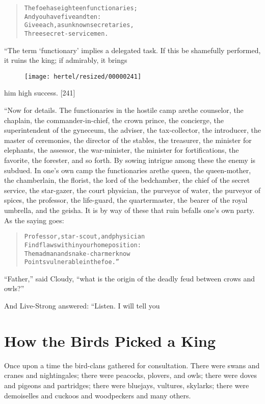 \documentclass[article, twoside, 10pt]{memoir}
\renewenvironment{verbatim}{%
\begin{quote}%
\vskip -10pt%
\begin{alltt}\normalfont\small}{\end{alltt}%
\end{quote}%
\vskip -10pt
} %
\begin{document}
\begin{verbatim}
The foe has eighteen functionaries;
    And you have five and ten:
Give each, as unknown secretaries,
    Three secret-service men.
\end{verbatim}
“The term `functionary' implies a delegated task. If this be
shamefully performed, it ruins the king; if admirably, it brings
\begin{figure}[p]\texttt{[image: hertel/resized/00000241]}\end{figure}him high success. [241]

“Now for details. The functionaries in the hostile camp are{\textemdash}the
counselor, the chaplain, the commander-in-chief, the crown prince,
the concierge, the superintendent of the gyneceum, the adviser, the
tax-collector, the introducer, the master of ceremonies, the
director of the stables, the treasurer, the minister for elephants,
the assessor, the war-minister, the minister for fortifications,
the favorite, the forester, and so forth. By sowing intrigue among
these the enemy is subdued. In one's own camp the functionaries
are{\textemdash}the queen, the queen-mother, the chamberlain, the florist,
the lord of the bedchamber, the chief of the secret service, the
star-gazer, the court physician, the purveyor of water, the
purveyor of spices, the professor, the life-guard, the
quartermaster, the bearer of the royal umbrella, and the geisha. It
is by way of these that ruin befalls one's own party. As the saying
goes:

\begin{verbatim}
Professor, star-scout, and physician
Find flaws within your home position:
The madman and snake-charmer know
Points vulnerable in the foe.”
\end{verbatim}
``Father,'' said Cloudy,
``what is the origin of the deadly feud between crows and owls?''

And Live-Strong answered: “Listen. I will tell you

\chapter{How the Birds Picked a King}

Once upon a time the bird-clans gathered for consultation. There
were swans and cranes and nightingales; there were peacocks,
plovers, and owls; there were doves and pigeons and partridges;
there were bluejays, vultures, skylarks; there were demoiselles and
cuckoos and woodpeckers and many others.
\end{document}
